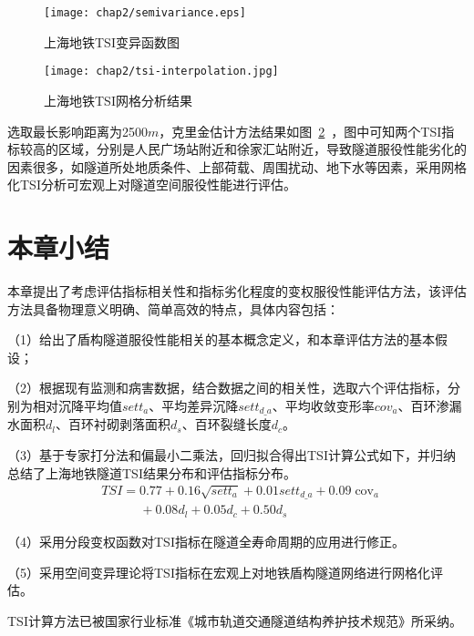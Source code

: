 \begin{figure}[htb!]
    \centering
    \texttt{[image: chap2/semivariance.eps]}
    \caption{上海地铁TSI变异函数图}
    \label{fig:上海地铁TSI变异函数图}
\end{figure}

\begin{figure}[htb!]
    \centering
    \texttt{[image: chap2/tsi-interpolation.jpg]}
    \caption{上海地铁TSI网格分析结果}
    \label{fig:上海地铁TSI网格分析结果}
\end{figure}

选取最长影响距离为2500$m$，克里金估计方法结果如图~\ref{fig:上海地铁TSI网格分析结果}~，图中可知两个TSI指标较高的区域，分别是人民广场站附近和徐家汇站附近，导致隧道服役性能劣化的因素很多，如隧道所处地质条件、上部荷载、周围扰动、地下水等因素，采用网格化TSI分析可宏观上对隧道空间服役性能进行评估。

\section{本章小结}

本章提出了考虑评估指标相关性和指标劣化程度的变权服役性能评估方法，该评估方法具备物理意义明确、简单高效的特点，具体内容包括：

（1）给出了盾构隧道服役性能相关的基本概念定义，和本章评估方法的基本假设；

（2）根据现有监测和病害数据，结合数据之间的相关性，选取六个评估指标，分别为相对沉降平均值${sett}_{a}$、平均差异沉降$set{{t}_{d\_a}}$、平均收敛变形率${cov}_{a}$、百环渗漏水面积${d}_{l}$、百环衬砌剥落面积${d}_{s}$、百环裂缝长度${d}_{c}$。

（3）基于专家打分法和偏最小二乘法，回归拟合得出TSI计算公式如下，并归纳总结了上海地铁隧道TSI结果分布和评估指标分布。
\begin{align}
  & TSI=0.77+0.16\sqrt{set{{t}_{a}}}+0.01set{{t}_{d\_a}}+0.09{{\operatorname{cov}}_{a}} \nonumber \\ 
 & \quad \quad \quad +0.08{{d}_{l}}+0.05{{d}_{c}}+0.50{{d}_{s}} \nonumber 
\end{align}

（4）采用分段变权函数对TSI指标在隧道全寿命周期的应用进行修正。

（5）采用空间变异理论将TSI指标在宏观上对地铁盾构隧道网络进行网格化评估。

TSI计算方法已被国家行业标准《城市轨道交通隧道结构养护技术规范》所采纳。

